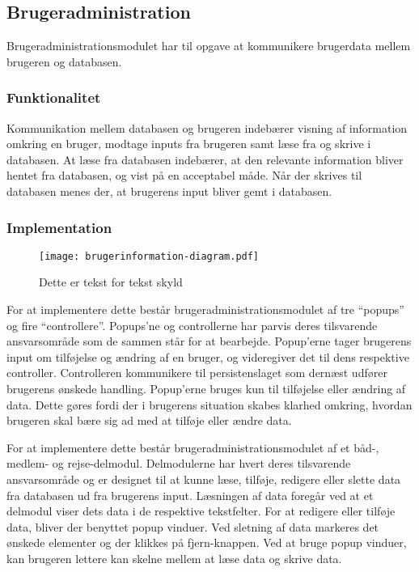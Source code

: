 \subsection{Brugeradministration}
\label{sub:Brugeradministration}

Brugeradministrationsmodulet har til opgave at kommunikere brugerdata mellem brugeren og databasen.

\subsubsection{Funktionalitet}
\label{ssub:Brugeradministration_funktionalitet}

Kommunikation mellem databasen og brugeren indebærer visning af information omkring en bruger, modtage inputs fra brugeren samt læse fra og skrive i databasen. At læse fra databasen indebærer, at den relevante information bliver hentet fra databasen, og vist på en acceptabel måde. Når der skrives til databasen menes der, at brugerens input bliver gemt i databasen. 

\subsubsection{Implementation}
\label{ssub:Brugeradministration_implementation}

\begin{figure}
  \centering
  \texttt{[image: brugerinformation-diagram.pdf]}
  \caption{Dette er tekst for tekst skyld}
  \label{fig:brugermod}
\end{figure}

For at implementere dette består brugeradministrationsmodulet af tre \enquote{popups} og fire \enquote{controllere}. Popups'ne og controllerne har parvis deres tilsvarende ansvarsområde som de sammen står for at bearbejde. Popup'erne tager brugerens input om tilføjelse og ændring af en bruger, og videregiver det til dens respektive controller. Controlleren kommunikere til persistenslaget som dernæst udfører brugerens ønskede handling. Popup'erne bruges kun til tilføjelse eller ændring af data. Dette gøres fordi der i brugerens situation skabes klarhed omkring, hvordan brugeren skal bære sig ad med at tilføje eller ændre data.

For at implementere dette består brugeradministrationsmodulet af et båd-, medlem- og rejse-delmodul. Delmodulerne har hvert deres tilsvarende ansvarsområde og er designet til at kunne læse, tilføje, redigere eller slette data fra databasen ud fra brugerens input. Læsningen af data foregår ved at et delmodul viser dets data i de respektive tekstfelter. For at redigere eller tilføje data, bliver der benyttet popup vinduer. Ved sletning af data markeres det ønskede elementer og der klikkes på fjern-knappen. Ved at bruge popup vinduer, kan brugeren lettere kan skelne mellem at læse data og skrive data.
